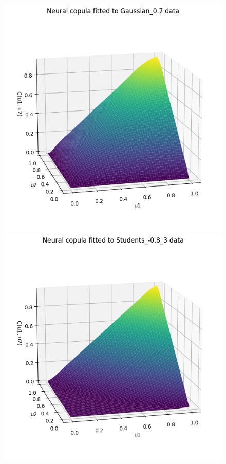 \documentclass[%
a4paper,							
11pt,								
bibliography=totoc,						
abstracton=true					
]
{scrartcl}
\theoremstyle{plain}
\theoremstyle{definition}
\theoremstyle{remark}
\newcommand{\1}{\mathbbm{1}}
\begin{document}
\begin{figure}[H]
\begin{minipage}{0.45\textwidth}
        \includegraphics[width=\textwidth]{5ResultsDiscussion/pictures/PortfolioTest/CopulaSurface2.png}
    \end{minipage}
    \vfill
    \begin{minipage}{0.45\textwidth}
        \centering
        \includegraphics[width=\textwidth]{5ResultsDiscussion/pictures/PortfolioTest/CopulaSurface3.png}

\end{minipage}
\end{figure}
\end{document}
